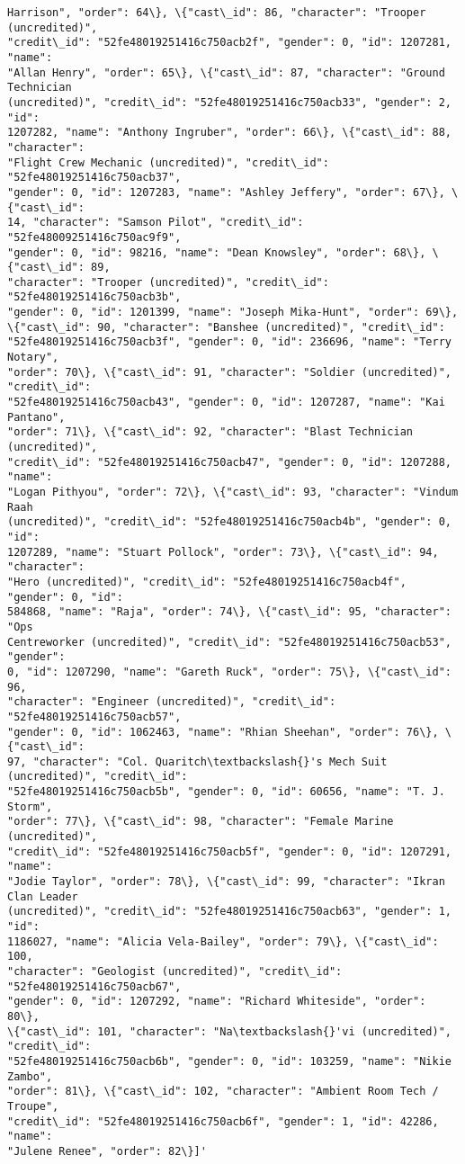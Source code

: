 \documentclass[11pt]{article}
\begin{document}
\begin{tcolorbox}[breakable, size=fbox, boxrule=.5pt, pad at break*=1mm, opacityfill=0]
\begin{Verbatim}[commandchars=\\\{\}]
Harrison", "order": 64\}, \{"cast\_id": 86, "character": "Trooper (uncredited)",
"credit\_id": "52fe48019251416c750acb2f", "gender": 0, "id": 1207281, "name":
"Allan Henry", "order": 65\}, \{"cast\_id": 87, "character": "Ground Technician
(uncredited)", "credit\_id": "52fe48019251416c750acb33", "gender": 2, "id":
1207282, "name": "Anthony Ingruber", "order": 66\}, \{"cast\_id": 88, "character":
"Flight Crew Mechanic (uncredited)", "credit\_id": "52fe48019251416c750acb37",
"gender": 0, "id": 1207283, "name": "Ashley Jeffery", "order": 67\}, \{"cast\_id":
14, "character": "Samson Pilot", "credit\_id": "52fe48009251416c750ac9f9",
"gender": 0, "id": 98216, "name": "Dean Knowsley", "order": 68\}, \{"cast\_id": 89,
"character": "Trooper (uncredited)", "credit\_id": "52fe48019251416c750acb3b",
"gender": 0, "id": 1201399, "name": "Joseph Mika-Hunt", "order": 69\},
\{"cast\_id": 90, "character": "Banshee (uncredited)", "credit\_id":
"52fe48019251416c750acb3f", "gender": 0, "id": 236696, "name": "Terry Notary",
"order": 70\}, \{"cast\_id": 91, "character": "Soldier (uncredited)", "credit\_id":
"52fe48019251416c750acb43", "gender": 0, "id": 1207287, "name": "Kai Pantano",
"order": 71\}, \{"cast\_id": 92, "character": "Blast Technician (uncredited)",
"credit\_id": "52fe48019251416c750acb47", "gender": 0, "id": 1207288, "name":
"Logan Pithyou", "order": 72\}, \{"cast\_id": 93, "character": "Vindum Raah
(uncredited)", "credit\_id": "52fe48019251416c750acb4b", "gender": 0, "id":
1207289, "name": "Stuart Pollock", "order": 73\}, \{"cast\_id": 94, "character":
"Hero (uncredited)", "credit\_id": "52fe48019251416c750acb4f", "gender": 0, "id":
584868, "name": "Raja", "order": 74\}, \{"cast\_id": 95, "character": "Ops
Centreworker (uncredited)", "credit\_id": "52fe48019251416c750acb53", "gender":
0, "id": 1207290, "name": "Gareth Ruck", "order": 75\}, \{"cast\_id": 96,
"character": "Engineer (uncredited)", "credit\_id": "52fe48019251416c750acb57",
"gender": 0, "id": 1062463, "name": "Rhian Sheehan", "order": 76\}, \{"cast\_id":
97, "character": "Col. Quaritch\textbackslash{}'s Mech Suit (uncredited)", "credit\_id":
"52fe48019251416c750acb5b", "gender": 0, "id": 60656, "name": "T. J. Storm",
"order": 77\}, \{"cast\_id": 98, "character": "Female Marine (uncredited)",
"credit\_id": "52fe48019251416c750acb5f", "gender": 0, "id": 1207291, "name":
"Jodie Taylor", "order": 78\}, \{"cast\_id": 99, "character": "Ikran Clan Leader
(uncredited)", "credit\_id": "52fe48019251416c750acb63", "gender": 1, "id":
1186027, "name": "Alicia Vela-Bailey", "order": 79\}, \{"cast\_id": 100,
"character": "Geologist (uncredited)", "credit\_id": "52fe48019251416c750acb67",
"gender": 0, "id": 1207292, "name": "Richard Whiteside", "order": 80\},
\{"cast\_id": 101, "character": "Na\textbackslash{}'vi (uncredited)", "credit\_id":
"52fe48019251416c750acb6b", "gender": 0, "id": 103259, "name": "Nikie Zambo",
"order": 81\}, \{"cast\_id": 102, "character": "Ambient Room Tech / Troupe",
"credit\_id": "52fe48019251416c750acb6f", "gender": 1, "id": 42286, "name":
"Julene Renee", "order": 82\}]'
\end{Verbatim}
\end{tcolorbox}
        
\end{document}
